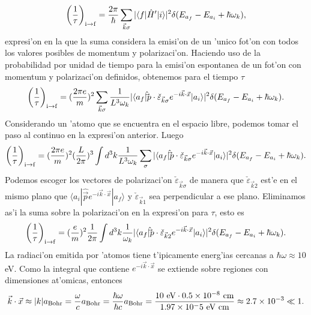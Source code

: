 \begin{equation}
\left(\frac{1}{\tau}\right)_{\rm i\rightarrow
f}=\frac{2\pi}{\hbar}\sum_{\vec{k}\sigma}
|\langle f|{\hat H}'|i\rangle |^2\delta(E_{a_f}-E_{a_i}+\hbar\omega_k),
\end{equation} 
expresi'on en la que la suma considera la emisi'on de un 'unico fot'on con todos
los valores posibles de momentum y polarizaci'on.
Haciendo uso de la probabilidad por unidad de tiempo para la emisi'on espontanea
de un fot'on con momentum y polarizaci'on definidos, obtenemos para el tiempo
$\tau$
\begin{equation}
\left(\frac{1}{\tau}\right)_{\rm i\rightarrow f}=
(\frac{2\pi e}{m})^2
\sum_{\vec{k}\sigma}
\frac{1}{L^3\omega_k}
|\langle a_f|{\hat\vec{p}}\cdot\check{\varepsilon}_{\vec{k}\sigma}e^{-i\vec{k}
\cdot\vec{x}}|a_i\rangle |^2\delta(E_{a_f}-E_{a_i}+\hbar\omega_k).
\end{equation}
Considerando un 'atomo que se encuentra en el espacio libre, podemos tomar el
paso al continuo en la expresi'on anterior. Luego
\begin{equation}
\left(\frac{1}{\tau}\right)_{\rm i\rightarrow f}=
(\frac{2\pi e}{m})^2
(\frac{L}{2\pi})^3\int d^3k
\frac{1}{L^3\omega_k}\sum_{\sigma}
|\langle
a_f|{\hat\vec{p}}\cdot\check{\varepsilon}_{\vec{k}\sigma}
e^{-i\vec{k}\cdot\vec{x}}|a_i\rangle |^2\delta(E_{a_f}-E_{a_i}+\hbar\omega_k).
\end{equation}
Podemos escoger los vectores de
polarizaci'on $\check{\varepsilon}_{\vec{k}\sigma}$ de manera que
$\check{\varepsilon}_{\vec{k}2}$ est'e en el mismo plano que
$\langle a_i|{\hat \vec{p}}e^{-i\vec{k}\cdot\vec{x}}|a_f\rangle $ y
$\check{\varepsilon}_{\vec{k}1}$ sea
perpendicular a ese plano.  Eliminamos as'i la suma sobre la polarizaci'on en la
expresi'on para $\tau$, esto es
\begin{equation}\label{vm}
\left(\frac{1}{\tau}\right)_{\rm i\rightarrow
f}=(\frac{e}{m})^2\frac{1}{2\pi}\int d^3k
\frac{1}{\omega_k}|\langle
a_f|{\hat\vec{p}}\cdot\check{\varepsilon}_{\vec{k}2}e^{
-i\vec{k}\cdot\vec{x}}|a_i\rangle |^2\delta(E_{a_f}-E_{a_i}+\hbar\omega_k).
\end{equation}
La radiaci'on emitida por 'atomos tiene t'ipicamente energ'ias cercanas a 
$\hbar\omega\approx 10$ eV. Como la integral que contiene
$e^{-i\vec{k}\cdot\vec{x}}$ se extiende sobre regiones con dimensiones
at'omicas, entonces
\begin{equation}
 \vec{k}\cdot\vec{x}\approx |k|a_{\rm Bohr}=\frac{\omega}{c}a_{\rm
Bohr}=\frac{\hbar\omega}{\hbar c}a_{\rm Bohr}=\frac{10\text{ eV} \cdot
0.5\times 10^{-8}\text{ cm}}{1.97\times 10^-5 \text{ eV cm}}\approx 2.7\times
10^{-3} \ll 1.
\end{equation} 
